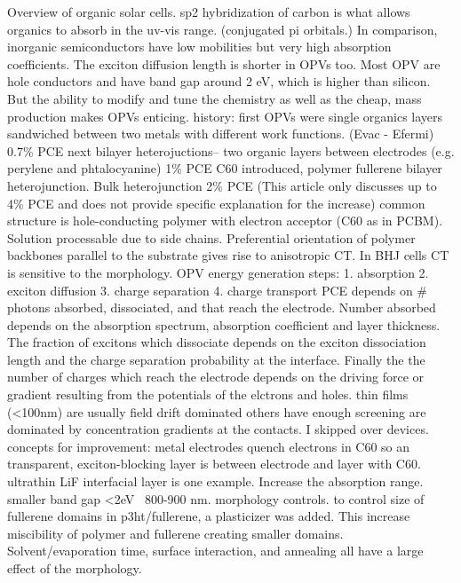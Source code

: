 \documentclass{article}
\begin{document}
Overview of organic solar cells. sp2 hybridization of carbon is what allows organics to absorb in the uv-vis range. (conjugated pi orbitals.) In comparison, inorganic semiconductors have low mobilities but very high absorption coefficients. The exciton diffusion length is shorter in OPVs too.
Most OPV are hole conductors and have band gap around 2 eV, which is higher than silicon. But the ability to modify and tune the chemistry as well as the cheap, mass production makes OPVs enticing.
history: 
first OPVs were single organics layers sandwiched between two metals with different work functions. (Evac - Efermi) 0.7\% PCE
next bilayer heterojuctions-- two organic layers between electrodes (e.g. perylene and phtalocyanine) 1\% PCE
C60 introduced, polymer fullerene bilayer heterojunction.
Bulk heterojunction 2\% PCE
(This article only discusses up to 4\% PCE and does not provide specific explanation for the increase)
common structure is hole-conducting polymer with electron acceptor (C60 as in PCBM). Solution processable due to side chains. Preferential orientation of polymer backbones parallel to the substrate gives rise to anisotropic CT. In BHJ cells CT is sensitive to the morphology.
OPV energy generation steps: 
1. absorption
2. exciton diffusion
3. charge separation
4. charge transport
PCE depends on # photons absorbed, dissociated, and that reach the electrode. Number absorbed depends on the absorption spectrum, absorption coefficient and layer thickness. The fraction of excitons which dissociate depends on the exciton dissociation length and the charge separation probability at the interface. Finally the the number of charges which reach the electrode depends on the driving force or gradient resulting from the potentials of the elctrons and holes. thin films (<100nm) are usually field drift dominated others have enough screening are dominated by concentration gradients at the contacts.
I skipped over devices.
concepts for improvement:
metal electrodes quench electrons in C60 so an transparent, exciton-blocking layer is between electrode and layer with C60. ultrathin LiF interfacial layer is one example. 
Increase the absorption range. smaller band gap <2eV ~800-900 nm.
morphology controls. to control size of fullerene domains in p3ht/fullerene, a plasticizer was added. This increase miscibility of polymer and fullerene creating smaller domains. Solvent/evaporation time, surface interaction, and annealing all have a large effect of the morphology.
\end{document}
